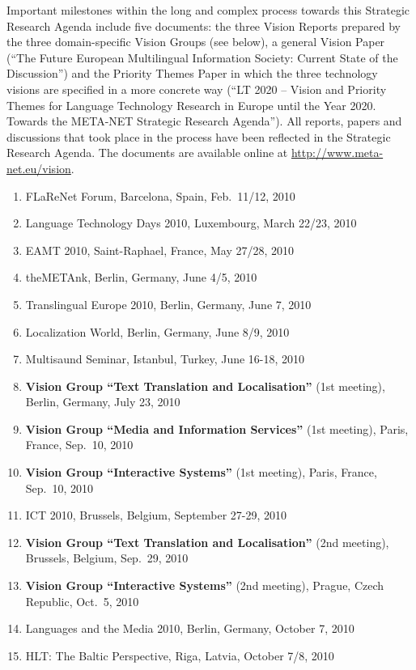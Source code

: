 \documentclass[10pt, plain]{../../metanetpaper}
\begin{document}
Important milestones within the long and complex process towards this Strategic Research Agenda include five documents: the three Vision Reports prepared by the three domain-specific Vision Groups (see below), a general Vision Paper (``The Future European Multilingual Information Society: Current State of the Discussion'') and the Priority Themes Paper in which the three technology visions are specified in a more concrete way (``LT 2020 -- Vision and Priority Themes for Language Technology Research in Europe until the Year 2020. Towards the META-NET Strategic Research Agenda''). All reports, papers and discussions that took place in the process have been reflected in the Strategic Research Agenda. The documents are available online at \url{http://www.meta-net.eu/vision}.

\begin{small}
\begin{enumerate}
\item FLaReNet Forum, Barcelona, Spain, Feb.~11/12, 2010
\item Language Technology Days 2010, Luxembourg, March 22/23, 2010
\item EAMT 2010, Saint-Raphael, France, May 27/28, 2010
\item theMETAnk, Berlin, Germany, June 4/5, 2010
\item Translingual Europe 2010, Berlin, Germany, June 7, 2010
\item Localization World, Berlin, Germany, June 8/9, 2010
\item Multisaund Seminar, Istanbul, Turkey, June 16-18, 2010
\item \textbf{Vision Group ``Text Translation and Localisation''} (1st meeting), Berlin, Germany, July 23, 2010
\item \textbf{Vision Group ``Media and Information Services''} (1st meeting), Paris, France, Sep.~10, 2010
\item \textbf{Vision Group ``Interactive Systems''} (1st meeting), Paris, France, Sep.~10, 2010
\item ICT 2010, Brussels, Belgium, September 27-29, 2010
\item \textbf{Vision Group ``Text Translation and Localisation''} (2nd meeting), Brussels, Belgium, Sep.~29, 2010
\item \textbf{Vision Group ``Interactive Systems''} (2nd meeting), Prague, Czech Republic, Oct.~5, 2010
\item Languages and the Media 2010, Berlin, Germany, October 7, 2010
\item HLT: The Baltic Perspective, Riga, Latvia, October 7/8, 2010

\end{enumerate}
\end{small}
\end{document}
